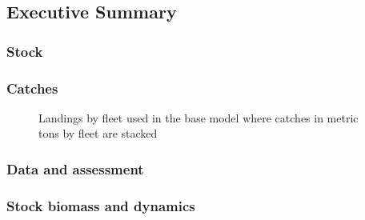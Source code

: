 \documentclass[
]{scrartcl}
\begin{document}
\subsection{Executive Summary}\label{executive-summary}

\subsubsection{Stock}\label{stock}

\subsubsection{Catches}\label{catches}

\clearpage



\begin{figure}


\caption{\label{fig-es-catch}Landings by fleet used in the base model
where catches in metric tons by fleet are stacked}

\end{figure}%

\clearpage

\subsubsection{Data and assessment}\label{data-and-assessment}

\subsubsection{Stock biomass and
dynamics}\label{stock-biomass-and-dynamics}
\end{document}

